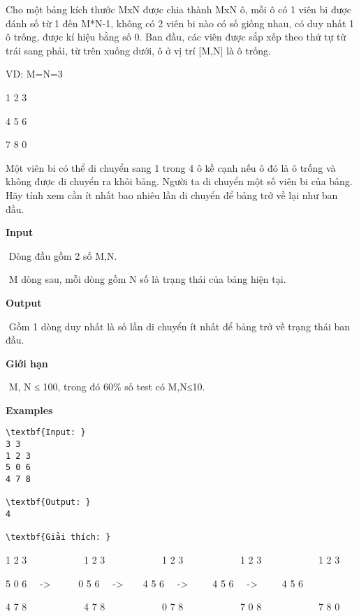 

Cho một bảng kích thước MxN được chia thành MxN ô, mỗi ô có 1 viên bi được đánh số từ 1 đến M*N-1, không có 2 viên bi nào có số giống nhau, có duy nhất 1 ô trống, được kí hiệu bằng số 0. Ban đầu, các viên được sắp xếp theo thứ tự từ trái sang phải, từ trên xuống dưới, ô ở vị trí [M,N] là ô trống.

VD: M=N=3

1 2 3

4 5 6

7 8 0

Một viên bi có thể di chuyển sang 1 trong 4 ô kề cạnh nếu ô đó là ô trống và không được di chuyển ra khỏi bảng. Người ta di chuyển một số viên bi của bảng. Hãy tính xem cần ít nhất bao nhiêu lần di chuyển để bảng trở về lại như ban đầu.

\textbf{Input}

 Dòng đầu gồm 2 số M,N.

 M dòng sau, mỗi dòng gồm N số là trạng thái của bảng hiện tại.

\textbf{Output}

 Gồm 1 dòng duy nhất là số lần di chuyển ít nhất để bảng trở về trạng thái ban đầu.

\textbf{Giới hạn}

 M, N ≤ 100, trong đó 60\% số test có M,N≤10.

\textbf{Examples}
\begin{verbatim}
\textbf{Input: }
3 3
1 2 3
5 0 6
4 7 8

\textbf{Output: }
4

\textbf{Giải thích: }\end{verbatim}

1 2 3            1 2 3            1 2 3            1 2 3            1 2 3

5 0 6   ->      0 5 6   ->     4 5 6   ->      4 5 6   ->      4 5 6

4 7 8            4 7 8            0 7 8            7 0 8            7 8 0
